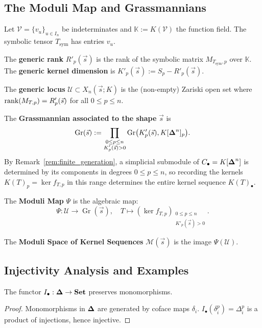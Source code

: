 \subsection{The Moduli Map and Grassmannians}

Let $\mathcal{V} = \{v_u\}_{u \in I_n}$ be indeterminates and
$\mathbb{K} := K(\mathcal{V})$ the function field. The symbolic tensor
$T_{\mathrm{sym}}$ has entries $v_u$.

\begin{definition}
The \textbf{generic rank} $R'_p(\vec s)$ is the rank of the symbolic
matrix $M_{T_{\mathrm{sym}},p}$ over $\mathbb{K}$.
The \textbf{generic kernel dimension} is
$K'_p(\vec s) := S_p - R'_p(\vec s)$.
\end{definition}

\begin{definition}
The \textbf{generic locus} $\mathcal{U} \subset X_n(\vec s;K)$ is the
(non-empty) Zariski open set where $\operatorname{rank}(M_{T,p}) = R'_p(\vec s)$
for all $0\le p\le n$.


The \textbf{Grassmannian associated to the shape} $\vec s$ is
\[
\operatorname{Gr}(\vec s)
:= \prod_{\substack{0\le p\le n\\ K'_p(\vec s)>0}}
   \operatorname{Gr}\bigl(K'_p(\vec{s}), K[\boldsymbol{\Delta}^n]_p\bigr).
\]
By Remark~\ref{rem:finite_generation}, a simplicial submodule of
$C_\bullet=K[\boldsymbol{\Delta}^n]$ is determined by its components in degrees
$0\le p\le n$, so recording the kernels $K(T)_p=\ker f_{T,p}$ in this
range determines the entire kernel sequence $K(T)_\bullet$.

The \textbf{Moduli Map} $\Psi$ is the algebraic map:
\[
\Psi: \mathcal{U} \longrightarrow \operatorname{Gr}(\vec s),
\quad
T \mapsto (\ker f_{T,p})_{\substack{0\le p\le n\\ K'_p(\vec s)>0}}.
\]

The \textbf{Moduli Space of Kernel Sequences} $\mathcal{M}(\vec s)$ is
the image $\Psi(\mathcal{U})$.
\end{definition}


\subsection{Injectivity Analysis and Examples}

\begin{lemma}\label{lem:I_bullet_preserves_mono}
The functor $I_\bullet: \boldsymbol{\Delta} \to \mathbf{Set}$ preserves monomorphisms.
\end{lemma}
\begin{proof}
Monomorphisms in $\boldsymbol{\Delta}$ are generated by coface maps $\delta_i$.
$I_\bullet(\delta_i^p) = \Delta_i^p$ is a product of injections, hence
injective.
\end{proof}

